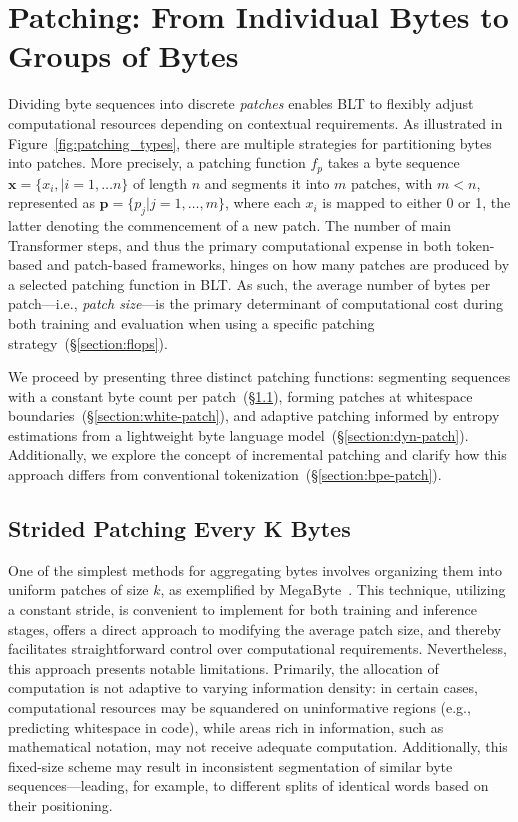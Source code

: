 \section{Patching: From Individual Bytes to Groups of Bytes}
\label{section:patching}

Dividing byte sequences into discrete \textit{patches} enables {\textsc BLT} to flexibly adjust computational resources depending on contextual requirements. As illustrated in Figure~\ref{fig:patching_types}, there are multiple strategies for partitioning bytes into patches. More precisely, a patching function $f_p$ takes a byte sequence $\pmb{x}=\{x_i,|i=1,\ldots n\}$ of length $n$ and segments it into $m$ patches, with $m < n$, represented as $\pmb{p}=\{p_j|j=1,\ldots,m\}$, where each $x_i$ is mapped to either 0 or 1, the latter denoting the commencement of a new patch. The number of main Transformer steps, and thus the primary computational expense in both token-based and patch-based frameworks, hinges on how many patches are produced by a selected patching function in {\textsc BLT}. As such, the average number of bytes per patch—i.e., \textit{patch size}—is the primary determinant of computational cost during both training and evaluation when using a specific patching strategy~(\S\ref{section:flops}).

We proceed by presenting three distinct patching functions: segmenting sequences with a constant byte count per patch~(\S\ref{section:static-patch}), forming patches at whitespace boundaries~(\S\ref{section:white-patch}), and adaptive patching informed by entropy estimations from a lightweight byte language model~(\S\ref{section:dyn-patch}). Additionally, we explore the concept of incremental patching and clarify how this approach differs from conventional tokenization~(\S\ref{section:bpe-patch}).

\subsection{Strided Patching Every K Bytes}
\label{section:static-patch}

One of the simplest methods for aggregating bytes involves organizing them into uniform patches of size $k$, as exemplified by MegaByte~\citep{yu2023megabyte}. This technique, utilizing a constant stride, is convenient to implement for both training and inference stages, offers a direct approach to modifying the average patch size, and thereby facilitates straightforward control over computational requirements. Nevertheless, this approach presents notable limitations. Primarily, the allocation of computation is not adaptive to varying information density: in certain cases, computational resources may be squandered on uninformative regions (e.g., predicting whitespace in code), while areas rich in information, such as mathematical notation, may not receive adequate computation. Additionally, this fixed-size scheme may result in inconsistent segmentation of similar byte sequences—leading, for example, to different splits of identical words based on their positioning.

